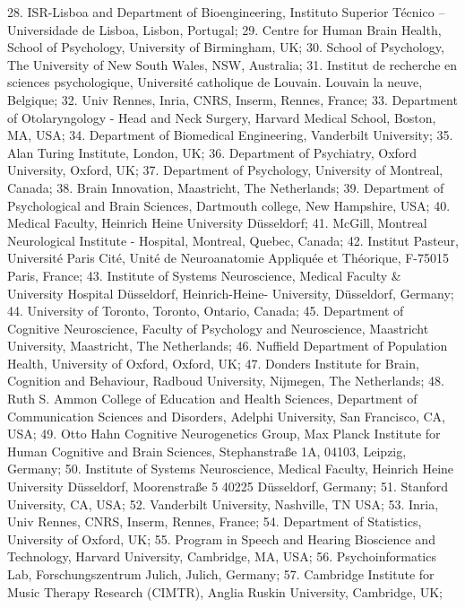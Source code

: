 \documentclass[10pt,a4paper,twocolumns]{proc}
\begin{document}
{28. ISR-Lisboa and Department of Bioengineering, Instituto Superior Técnico – Universidade de Lisboa, Lisbon, Portugal; %
29. Centre for Human Brain Health, School of Psychology, University of Birmingham, UK; %
30. School of Psychology, The University of New South Wales, NSW, Australia; %
31. Institut de recherche en sciences psychologique, Université catholique de Louvain. Louvain la neuve, Belgique; %
32. Univ Rennes, Inria, CNRS, Inserm, Rennes, France; %
33. Department of Otolaryngology - Head and Neck Surgery, Harvard Medical School, Boston, MA, USA; %
34. Department of Biomedical Engineering, Vanderbilt University; %
35. Alan Turing Institute, London, UK; %
36. Department of Psychiatry, Oxford University, Oxford, UK; %
37. Department of Psychology, University of Montreal, Canada; %
38. Brain Innovation, Maastricht, The Netherlands; %
39. Department of Psychological and Brain Sciences, Dartmouth college, New Hampshire, USA; %
40. Medical Faculty, Heinrich Heine University Düsseldorf; %
41. McGill, Montreal Neurological Institute - Hospital, Montreal, Quebec, Canada; %
42. Institut Pasteur, Université Paris Cité, Unité de Neuroanatomie Appliquée et Théorique, F-75015 Paris, France; %
43. Institute of Systems Neuroscience, Medical Faculty & University Hospital Düsseldorf, Heinrich-Heine- University, Düsseldorf, Germany; %
44. University of Toronto, Toronto, Ontario, Canada; %
45. Department of Cognitive Neuroscience, Faculty of Psychology and Neuroscience, Maastricht University, Maastricht, The Netherlands; %
46. Nuffield Department of Population Health, University of Oxford, Oxford, UK; %
47. Donders Institute for Brain, Cognition and Behaviour, Radboud University, Nijmegen, The Netherlands; %
48. Ruth S. Ammon College of Education and Health Sciences, Department of Communication Sciences and Disorders, Adelphi University, San Francisco, CA, USA; %
49. Otto Hahn Cognitive Neurogenetics Group, Max Planck Institute for Human Cognitive and Brain Sciences, Stephanstraße 1A, 04103, Leipzig, Germany; %
50. Institute of Systems Neuroscience, Medical Faculty, Heinrich Heine University Düsseldorf, Moorenstraße 5 40225 Düsseldorf, Germany; %
51. Stanford University, CA, USA; %
52. Vanderbilt University, Nashville, TN USA; %
53. Inria, Univ Rennes, CNRS, Inserm, Rennes, France; %
54. Department of Statistics, University of Oxford, UK; %
55. Program in Speech and Hearing Bioscience and Technology, Harvard University, Cambridge, MA, USA; %
56. Psychoinformatics Lab, Forschungszentrum Julich, Julich, Germany; %
57. Cambridge Institute for Music Therapy Research (CIMTR), Anglia Ruskin University, Cambridge, UK; %
}
\end{document}
